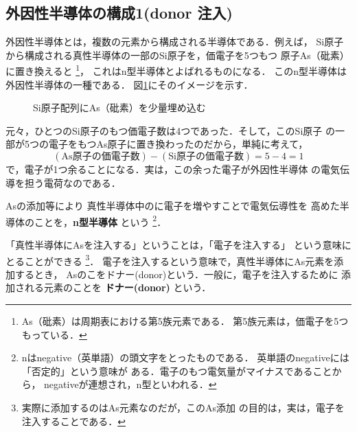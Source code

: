         \subsection{外因性半導体の構成1(donor 注入)}
            外因性半導体とは，複数の元素から構成される半導体である．例えば，
            Si原子から構成される真性半導体の一部のSi原子を，価電子を5つもつ
            原子As（砒素）に置き換えると
                \footnote{
                    As（砒素）は周期表における第5族元素である．
                    第5族元素は，価電子を5つもっている．
                }，
            これはn型半導体とよばれるものになる．
            このn型半導体は外因性半導体の一種である．
            図\ref{fig:SiAs}にそのイメージを示す．
                \begin{figure}[htbp]
                    \begin{center}
                        \caption{Si原子配列にAs（砒素）を少量埋め込む}
                        \label{fig:SiAs}
                    \end{center}
                \end{figure}

            元々，ひとつのSi原子のもつ価電子数は4つであった．そして，このSi原子
            の一部が5つの電子をもつAs原子に置き換わったのだから，単純に考えて，
                \begin{equation*}
                    (\mathrm{As}\mbox{原子の価電子数}) - (\mathrm{Si}\mbox{原子の価電子数}) = 5 -4 = 1
                \end{equation*}
            で，電子が1つ余ることになる．実は，この余った電子が外因性半導体
            の電気伝導を担う電荷なのである．

            Asの添加等により
            真性半導体中のに電子を増やすことで電気伝導性を
            高めた半導体のことを，\textbf{n型半導体} という
                \footnote{
                    nはnegative（英単語）の頭文字をとったものである．
                    英単語のnegativeには「否定的」という意味が
                    ある．電子のもつ電気量がマイナスであることから，
                    negativeが連想され，n型といわれる．
                }．

            「真性半導体にAsを注入する」ということは，「電子を注入する」
            という意味にとることができる
                \footnote{
                    実際に添加するのはAs元素なのだが，このAs添加
                    の目的は，実は，電子を注入することである．
                }．
            電子を注入するという意味で，真性半導体にAs元素を添加するとき，
            Asのこをドナー(donor)という．一般に，電子を注入するために
            添加される元素のことを \textbf{ドナー(donor)} という．

